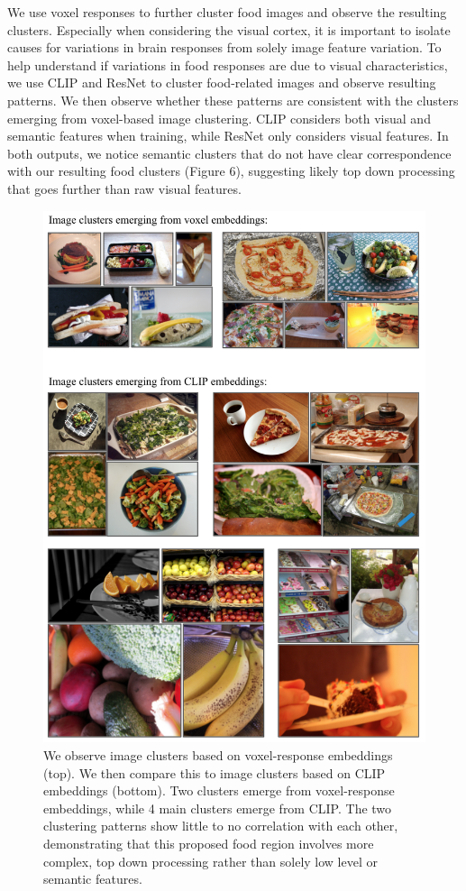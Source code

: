 \documentclass[../thesis.tex]{subfiles}
\begin{document}
We use voxel responses to further cluster food images and observe the resulting clusters. Especially when considering the visual cortex, it is important to isolate causes for variations in brain responses from solely image feature variation. To help understand if variations in food responses are due to visual characteristics, we use CLIP and ResNet to cluster food-related images and observe resulting patterns. We then observe whether these patterns are consistent with the clusters emerging from voxel-based image clustering. CLIP considers both visual and semantic features when training, while ResNet only considers visual features. In both outputs, we notice semantic clusters that do not have clear correspondence with our resulting food clusters (Figure 6), suggesting likely top down processing that goes further than raw visual features. 

    \begin{figure}
        \centering
        \includegraphics[scale=0.55]{fig6.png}
            \caption{We observe image clusters based on voxel-response embeddings (top). We then compare this to image clusters based on CLIP embeddings (bottom). Two clusters emerge from voxel-response embeddings, while 4 main clusters emerge from CLIP. The two clustering patterns show little to no correlation with each other, demonstrating that this proposed food region involves more complex, top down processing rather than solely low level or semantic features. } \label{fig1}
    \end{figure}
\end{document}
